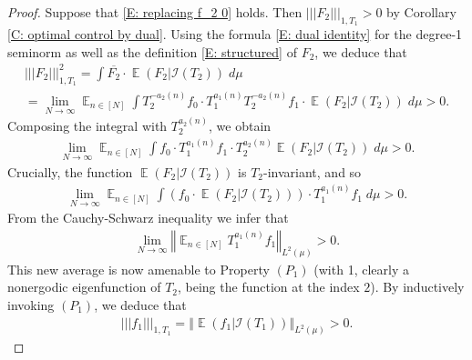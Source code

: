 \documentclass[11pt]{amsart}
\theoremstyle{definition}
\DeclareMathOperator*{\E}{\mathbb{E}}
\newcommand{\CI}{{\mathcal I}}
\newcommand{\norm}[1]{\left\Vert #1\right\Vert}
\newcommand{\nnorm}[1]{\lvert\!|\!| #1|\!|\!\rvert}
\newcommand{\1}{{\mathbf{1}}}
\begin{document}
\begin{proof}%
    Suppose that \eqref{E: replacing f_2 0} holds. Then $\nnorm{F_2}_{1, T_1}>0$ by Corollary \ref{C: optimal control by dual}. Using the formula \eqref{E: dual identity} for the degree-1 seminorm as well as the definition \eqref{E: structured} of $F_2$, we deduce that 
    \begin{multline*}
        \nnorm{F_2}_{1, T_1}^2 = \int \overline{F_2}\cdot \E(F_2|\CI(T_{2}))\; d\mu\\
        = \lim_{N\to\infty} \E_{n\in[N]} \int T_2^{-a_2(n)}{f_0}\cdot T_1^{a_1(n)}T_2^{-a_2(n)}{f_1}\cdot \E(F_2|\CI(T_{2}))\; d\mu >0.
    \end{multline*}
    Composing the integral with $T_{2}^{a_{2}(n)}$, we obtain
    \begin{align*}
        \lim_{N\to\infty} \E_{n\in[N]} \int f_0\cdot T_1^{a_1(n)}{f_1}\cdot T_{2}^{a_{2}(n)}\E(F_2|\CI(T_{2}))\; d\mu > 0.
    \end{align*}
    Crucially, the function $\E(F_2|\CI(T_{2}))$ is $T_{2}$-invariant, and so 
    \begin{align*}
        \lim_{N\to\infty} \E_{n\in[N]} \int (f_0\cdot \E(F_2|\CI(T_{2})))\cdot T_1^{a_1(n)}{f_1}\; d\mu > 0.
    \end{align*}
    From the Cauchy-Schwarz inequality we infer that
    \begin{align*}
        \lim_{N\to\infty} \norm{\E_{n\in[N]} T_1^{a_1(n)}{f_1}}_{L^2(\mu)} > 0.
    \end{align*}
    This new average is now amenable to Property $(P_1)$ (with 1, clearly a nonergodic eigenfunction of $T_{2}$, being the function at the index $2$). By inductively invoking $(P_1)$, we deduce that
    \begin{align*}
       \nnorm{f_1}_{1, T_1} = \norm{\E(f_1|\CI(T_1))}_{L^2(\mu)} > 0.
    \end{align*}
\end{proof}
\end{document}
